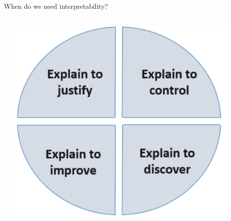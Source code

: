 \documentclass[11pt,compress,t,notes=noshow, aspectratio=169, xcolor=table]{beamer}
\begin{document}
\begin{frame}{When do we need interpretability?}
\begin{columns}[T]
\begin{column}{0.55\textwidth}
\begin{itemize}
\end{itemize}
\end{column}
\begin{column}{0.4\textwidth}  %
  \includegraphics[width=0.9\textwidth]{../../slides/intro/figure/explain-to}
   \centering {}
\end{column}
\end{columns}
\end{frame}




\end{document}

